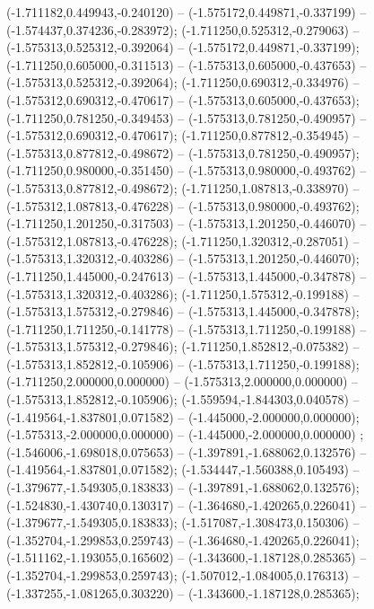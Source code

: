  (-1.711182,0.449943,-0.240120) -- (-1.575172,0.449871,-0.337199) -- (-1.574437,0.374236,-0.283972);
 (-1.711250,0.525312,-0.279063) -- (-1.575313,0.525312,-0.392064) -- (-1.575172,0.449871,-0.337199);
 (-1.711250,0.605000,-0.311513) -- (-1.575313,0.605000,-0.437653) -- (-1.575313,0.525312,-0.392064);
 (-1.711250,0.690312,-0.334976) -- (-1.575312,0.690312,-0.470617) -- (-1.575313,0.605000,-0.437653);
 (-1.711250,0.781250,-0.349453) -- (-1.575313,0.781250,-0.490957) -- (-1.575312,0.690312,-0.470617);
 (-1.711250,0.877812,-0.354945) -- (-1.575313,0.877812,-0.498672) -- (-1.575313,0.781250,-0.490957);
 (-1.711250,0.980000,-0.351450) -- (-1.575313,0.980000,-0.493762) -- (-1.575313,0.877812,-0.498672);
 (-1.711250,1.087813,-0.338970) -- (-1.575312,1.087813,-0.476228) -- (-1.575313,0.980000,-0.493762);
 (-1.711250,1.201250,-0.317503) -- (-1.575313,1.201250,-0.446070) -- (-1.575312,1.087813,-0.476228);
 (-1.711250,1.320312,-0.287051) -- (-1.575313,1.320312,-0.403286) -- (-1.575313,1.201250,-0.446070);
 (-1.711250,1.445000,-0.247613) -- (-1.575313,1.445000,-0.347878) -- (-1.575313,1.320312,-0.403286);
 (-1.711250,1.575312,-0.199188) -- (-1.575313,1.575312,-0.279846) -- (-1.575313,1.445000,-0.347878);
 (-1.711250,1.711250,-0.141778) -- (-1.575313,1.711250,-0.199188) -- (-1.575313,1.575312,-0.279846);
 (-1.711250,1.852812,-0.075382) -- (-1.575313,1.852812,-0.105906) -- (-1.575313,1.711250,-0.199188);
 (-1.711250,2.000000,0.000000) -- (-1.575313,2.000000,0.000000) -- (-1.575313,1.852812,-0.105906);
 (-1.559594,-1.844303,0.040578) -- (-1.419564,-1.837801,0.071582) -- (-1.445000,-2.000000,0.000000);
 (-1.575313,-2.000000,0.000000) -- (-1.445000,-2.000000,0.000000) ;
 (-1.546006,-1.698018,0.075653) -- (-1.397891,-1.688062,0.132576) -- (-1.419564,-1.837801,0.071582);
 (-1.534447,-1.560388,0.105493) -- (-1.379677,-1.549305,0.183833) -- (-1.397891,-1.688062,0.132576);
 (-1.524830,-1.430740,0.130317) -- (-1.364680,-1.420265,0.226041) -- (-1.379677,-1.549305,0.183833);
 (-1.517087,-1.308473,0.150306) -- (-1.352704,-1.299853,0.259743) -- (-1.364680,-1.420265,0.226041);
 (-1.511162,-1.193055,0.165602) -- (-1.343600,-1.187128,0.285365) -- (-1.352704,-1.299853,0.259743);
 (-1.507012,-1.084005,0.176313) -- (-1.337255,-1.081265,0.303220) -- (-1.343600,-1.187128,0.285365);
